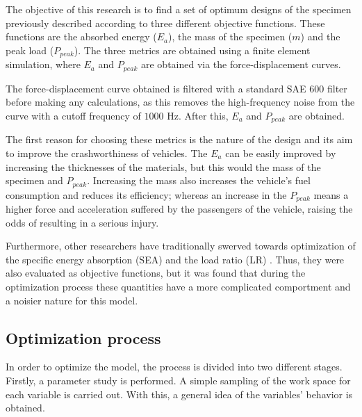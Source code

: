 \documentclass[cmfonts]{witpress}
\begin{document}
The objective of this research is to find a set of optimum designs of the specimen previously described according to three different objective functions. These functions are the absorbed energy ($E_a$), the mass of the specimen ($m$) and the peak load ($P_{peak}$). The three metrics are obtained using a finite element simulation, where $E_a$ and $P_{peak}$ are obtained via the force-displacement curves.

The force-displacement curve obtained is filtered with a standard SAE 600 filter \cite{J211} before making any calculations, as this removes the high-frequency noise from the curve with a cutoff frequency of ${1000}$ Hz. After this, $E_a$ and $P_{peak}$ are obtained.


The first reason for choosing these metrics is the nature of the design and its aim to improve the crashworthiness of vehicles. The $E_a$ can be easily improved by increasing the thicknesses of the materials, but this would the mass of the specimen and $P_{peak}$. Increasing the mass also  increases the vehicle's fuel consumption and reduces its efficiency; whereas an increase in the $P_{peak}$ means a higher force and acceleration suffered by the passengers of the vehicle, raising the odds of resulting in a serious injury.

Furthermore, other researchers have traditionally swerved towards optimization of the specific energy absorption (SEA) and the load ratio (LR) \cite{Hou2007555}. Thus, they were also evaluated as objective functions, but it was found that during the optimization process these quantities have a more complicated comportment and a noisier nature for this model. 

\subsection{Optimization process}

In order to optimize the model, the process is divided into two different stages. Firstly, a parameter study is performed. A simple sampling of the work space for each variable is carried out. With this, a general idea of the variables' behavior is obtained.
\end{document}
